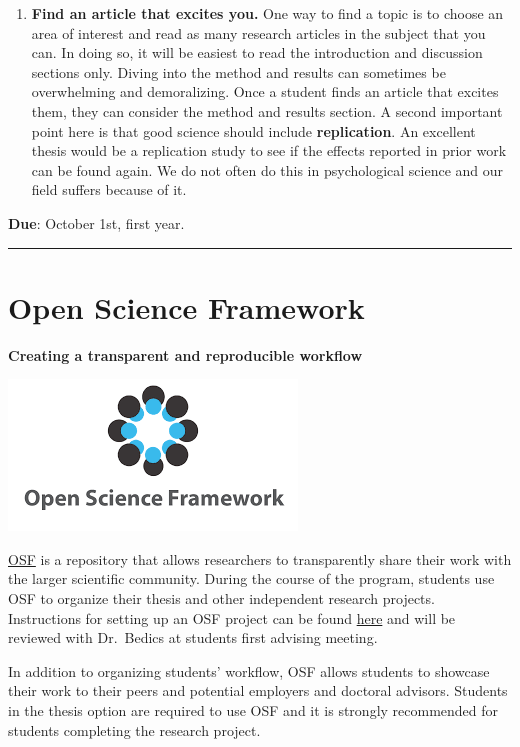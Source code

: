 \documentclass[openany]{book}
\begin{document}
\begin{enumerate}
\item
  \textbf{Find an article that excites you.} One way to find a topic is to choose an area of interest and read as many research articles in the subject that you can. In doing so, it will be easiest to read the introduction and discussion sections only. Diving into the method and results can sometimes be overwhelming and demoralizing. Once a student finds an article that excites them, they can consider the method and results section. A second important point here is that good science should include \textbf{replication}. An excellent thesis would be a replication study to see if the effects reported in prior work can be found again. We do not often do this in psychological science and our field suffers because of it.
\end{enumerate}

\textbf{Due}: October 1st, first year.

\begin{center}\rule{0.5\linewidth}{0.5pt}\end{center}

\hypertarget{open-science-framework}{%
\section{Open Science Framework}\label{open-science-framework}}

\textbf{Creating a transparent and reproducible workflow}

\includegraphics{images/osf.png}

\href{https://osf.io/}{OSF} is a repository that allows researchers to transparently share their work with the larger scientific community. During the course of the program, students use OSF to organize their thesis and other independent research projects. Instructions for setting up an OSF project can be found \href{https://speakerdeck.com/jdbedics/osf-setup-and-class-project-introduction}{here} and will be reviewed with Dr.~Bedics at students first advising meeting.

In addition to organizing students' workflow, OSF allows students to showcase their work to their peers and potential employers and doctoral advisors. Students in the thesis option are required to use OSF and it is strongly recommended for students completing the research project.
\end{document}
